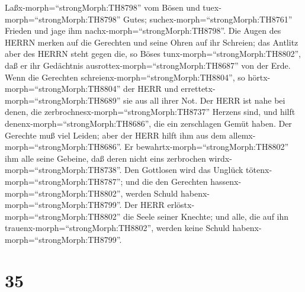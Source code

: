 Laßx-morph=``strongMorph:TH8798'' vom Bösen und
tuex-morph=``strongMorph:TH8798'' Gutes;
suchex-morph=``strongMorph:TH8761'' Frieden und jage ihm
nachx-morph=``strongMorph:TH8798''.  Die Augen des HERRN
merken auf die Gerechten und seine Ohren auf ihr Schreien; 
das Antlitz aber des HERRN steht gegen die, so Böses
tunx-morph=``strongMorph:TH8802'', daß er ihr Gedächtnis
ausrottex-morph=``strongMorph:TH8687'' von der Erde.  Wenn
die Gerechten schreienx-morph=``strongMorph:TH8804'', so
hörtx-morph=``strongMorph:TH8804'' der HERR und
errettetx-morph=``strongMorph:TH8689'' sie aus all ihrer Not.
 Der HERR ist nahe bei denen, die
zerbrochnesx-morph=``strongMorph:TH8737'' Herzens sind, und hilft
denenx-morph=``strongMorph:TH8686'', die ein zerschlagen Gemüt haben.
 Der Gerechte muß viel Leiden; aber der HERR hilft ihm aus
dem allemx-morph=``strongMorph:TH8686''.  Er
bewahrtx-morph=``strongMorph:TH8802'' ihm alle seine Gebeine, daß deren
nicht eins zerbrochen wirdx-morph=``strongMorph:TH8738''. 
Den Gottlosen wird das Unglück tötenx-morph=``strongMorph:TH8787''; und
die den Gerechten hassenx-morph=``strongMorph:TH8802'', werden Schuld
habenx-morph=``strongMorph:TH8799''.  Der HERR
erlöstx-morph=``strongMorph:TH8802'' die Seele seiner Knechte; und alle,
die auf ihn trauenx-morph=``strongMorph:TH8802'', werden keine Schuld
habenx-morph=``strongMorph:TH8799''.

\hypertarget{section-34}{%
\section{35}\label{section-34}}

